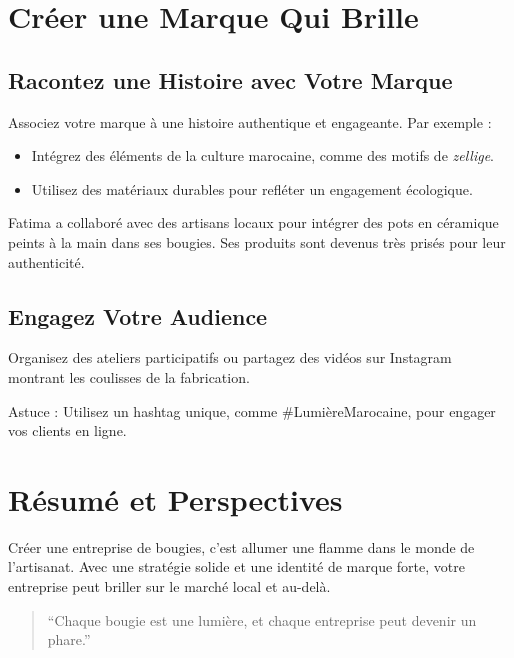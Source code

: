\documentclass[11pt,fleqn,onecolumn,oneside]{book}
\begin{document}
\section{Créer une Marque Qui Brille}

\subsection*{Racontez une Histoire avec Votre Marque}

Associez votre marque à une histoire authentique et engageante. Par exemple :
\begin{itemize}
    \item Intégrez des éléments de la culture marocaine, comme des motifs de \textit{zellige}.
    \item Utilisez des matériaux durables pour refléter un engagement écologique.
\end{itemize}

\begin{example}
Fatima a collaboré avec des artisans locaux pour intégrer des pots en céramique peints à la main dans ses bougies. Ses produits sont devenus très prisés pour leur authenticité.
\end{example}

\subsection*{Engagez Votre Audience}

Organisez des ateliers participatifs ou partagez des vidéos sur Instagram montrant les coulisses de la fabrication.

\begin{remark}
Astuce : Utilisez un hashtag unique, comme \#LumièreMarocaine, pour engager vos clients en ligne.
\end{remark}

\section{Résumé et Perspectives}

\begin{corollary}
Créer une entreprise de bougies, c’est allumer une flamme dans le monde de l’artisanat. Avec une stratégie solide et une identité de marque forte, votre entreprise peut briller sur le marché local et au-delà.
\end{corollary}

\begin{quote}
``Chaque bougie est une lumière, et chaque entreprise peut devenir un phare.''
\end{quote}
\end{document}
